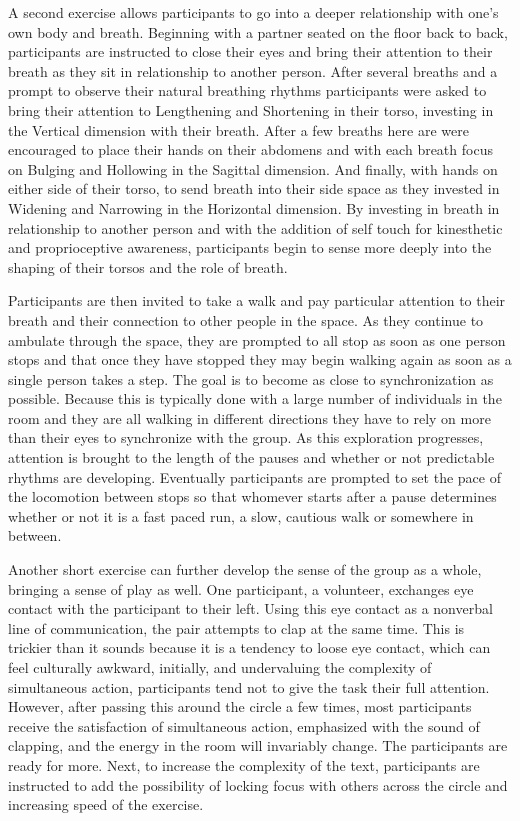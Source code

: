 \documentclass[arts,article,submit,moreauthors,pdftex,10pt,a4paper]{mdpi}
\begin{document}
A second exercise allows participants to go into a deeper relationship with one's own body and breath.  Beginning with a partner seated on the floor back to back, participants are instructed to close their eyes and bring their attention to their breath as they sit in relationship to another person. After several breaths and a prompt to observe their natural breathing rhythms participants were asked to bring their attention to Lengthening and Shortening in their torso, investing in the Vertical dimension with their breath. After a few breaths here are were encouraged to place their hands on their abdomens and with each breath focus on Bulging and Hollowing in the Sagittal dimension. And finally, with hands on either side of their torso, to send breath into their side space as they invested in Widening and Narrowing in the Horizontal dimension. By investing in breath in relationship to another person and with the addition of self touch for kinesthetic and proprioceptive awareness, participants begin to sense more deeply into the shaping of their torsos and the role of breath. 

Participants are then invited to take a walk and pay particular attention to their breath and their connection to other people in the space. As they continue to ambulate through the space, they are prompted to all stop as soon as one person stops and that once they have stopped they may begin walking again as soon as a single person takes a step. The goal is to become as close to synchronization as possible. Because this is typically done with a large number of individuals in the room and they are all walking in different directions they have to rely on more than their eyes to synchronize with the group. As this exploration progresses, attention is brought to the length of the pauses and whether or not predictable rhythms are developing. Eventually participants are prompted to set the pace of the locomotion between stops so that whomever starts after a pause determines whether or not it is a fast paced run, a slow, cautious walk or somewhere in between. 

Another short exercise can further develop the sense of the group as a whole, bringing a sense of play as well.  One participant, a volunteer, exchanges eye contact with the participant to their left.  Using this eye contact as a nonverbal line of communication, the pair attempts to clap at the same time.  This is trickier than it sounds because it is a tendency to loose eye contact, which can feel culturally awkward, initially, and undervaluing the complexity of simultaneous action, participants tend not to give the task their full attention.  However, after passing this around the circle a few times, most participants receive the satisfaction of simultaneous action, emphasized with the sound of clapping, and the energy in the room will invariably change.  The participants are ready for more.  Next, to increase the complexity of the text, participants are instructed to add the possibility of locking focus with others across the circle and increasing speed of the exercise.  
\end{document}
